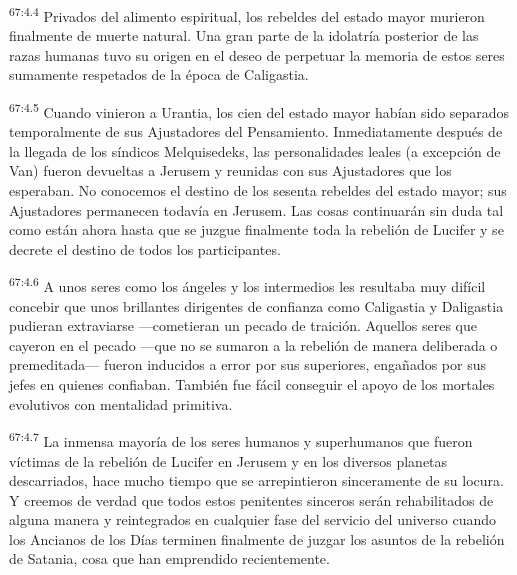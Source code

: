 \par
\textsuperscript{67:4.4} Privados del alimento espiritual, los rebeldes del estado mayor murieron finalmente de muerte natural. Una gran parte de la idolatría posterior de las razas humanas tuvo su origen en el deseo de perpetuar la memoria de estos seres sumamente respetados de la época de Caligastia.

\par
\textsuperscript{67:4.5} Cuando vinieron a Urantia, los cien del estado mayor habían sido separados temporalmente de sus Ajustadores del Pensamiento. Inmediatamente después de la llegada de los síndicos Melquisedeks, las personalidades leales (a excepción de Van) fueron devueltas a Jerusem y reunidas con sus Ajustadores que los esperaban. No conocemos el destino de los sesenta rebeldes del estado mayor; sus Ajustadores permanecen todavía en Jerusem. Las cosas continuarán sin duda tal como están ahora hasta que se juzgue finalmente toda la rebelión de Lucifer y se decrete el destino de todos los participantes.

\par
\textsuperscript{67:4.6} A unos seres como los ángeles y los intermedios les resultaba muy difícil concebir que unos brillantes dirigentes de confianza como Caligastia y Daligastia pudieran extraviarse ---cometieran un pecado de traición. Aquellos seres que cayeron en el pecado ---que no se sumaron a la rebelión de manera deliberada o premeditada--- fueron inducidos a error por sus superiores, engañados por sus jefes en quienes confiaban. También fue fácil conseguir el apoyo de los mortales evolutivos con mentalidad primitiva.

\par
\textsuperscript{67:4.7} La inmensa mayoría de los seres humanos y superhumanos que fueron víctimas de la rebelión de Lucifer en Jerusem y en los diversos planetas descarriados, hace mucho tiempo que se arrepintieron sinceramente de su locura. Y creemos de verdad que todos estos penitentes sinceros serán rehabilitados de alguna manera y reintegrados en cualquier fase del servicio del universo cuando los Ancianos de los Días terminen finalmente de juzgar los asuntos de la rebelión de Satania, cosa que han emprendido recientemente.

